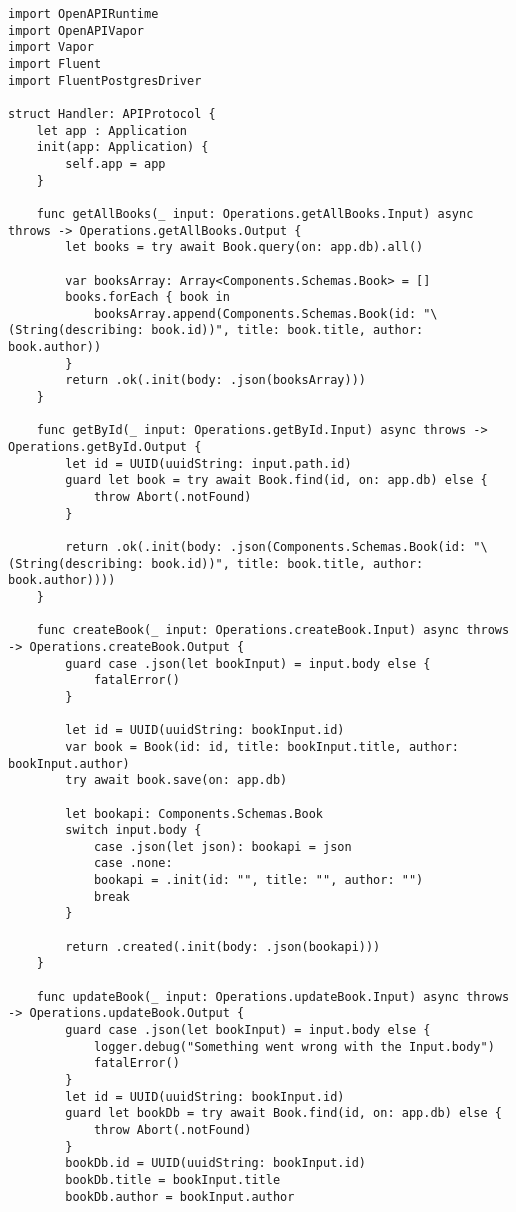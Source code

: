 \begin{lstlisting}[caption=handler file]
import OpenAPIRuntime
import OpenAPIVapor
import Vapor
import Fluent
import FluentPostgresDriver

struct Handler: APIProtocol { 
    let app : Application
    init(app: Application) {
        self.app = app
    }

    func getAllBooks(_ input: Operations.getAllBooks.Input) async throws -> Operations.getAllBooks.Output {
        let books = try await Book.query(on: app.db).all()
        
        var booksArray: Array<Components.Schemas.Book> = []
        books.forEach { book in
            booksArray.append(Components.Schemas.Book(id: "\(String(describing: book.id))", title: book.title, author: book.author))
        }
        return .ok(.init(body: .json(booksArray)))
    }
    
    func getById(_ input: Operations.getById.Input) async throws -> Operations.getById.Output {
        let id = UUID(uuidString: input.path.id)
        guard let book = try await Book.find(id, on: app.db) else {
            throw Abort(.notFound)
        }
        
        return .ok(.init(body: .json(Components.Schemas.Book(id: "\(String(describing: book.id))", title: book.title, author: book.author))))
    }

    func createBook(_ input: Operations.createBook.Input) async throws -> Operations.createBook.Output {
        guard case .json(let bookInput) = input.body else {
            fatalError()
        }
        
        let id = UUID(uuidString: bookInput.id)
        var book = Book(id: id, title: bookInput.title, author: bookInput.author)
        try await book.save(on: app.db)
        
        let bookapi: Components.Schemas.Book
        switch input.body {
            case .json(let json): bookapi = json
            case .none:
            bookapi = .init(id: "", title: "", author: "")
            break
        }
        
        return .created(.init(body: .json(bookapi)))
    }
    
    func updateBook(_ input: Operations.updateBook.Input) async throws -> Operations.updateBook.Output {
        guard case .json(let bookInput) = input.body else {
            logger.debug("Something went wrong with the Input.body")
            fatalError()
        }
        let id = UUID(uuidString: bookInput.id)
        guard let bookDb = try await Book.find(id, on: app.db) else {
            throw Abort(.notFound)
        }
        bookDb.id = UUID(uuidString: bookInput.id)
        bookDb.title = bookInput.title
        bookDb.author = bookInput.author
        

\end{lstlisting}
